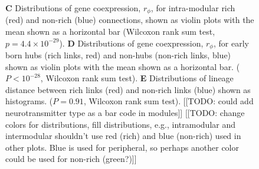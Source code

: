 \documentclass[10pt,letterpaper]{article}
\begin{document}
\begin{figure}[!h]
{%
\textbf{C} Distributions of gene coexpression, $r_\phi$, for intra-modular rich (red) and non-rich (blue) connections, shown as violin plots with the mean shown as a horizontal bar (Wilcoxon rank sum test, $p = 4.4\times 10^{-29}$).
\textbf{D} Distributions of gene coexpression, $r_\phi$, for early born hubs (rich links, red) and non-hubs (non-rich links, blue) shown as violin plots with the mean shown as a horizontal bar. ($P < 10^{-28}$, Wilcoxon rank sum test).
\textbf{E} Distributions of lineage distance between rich links (red) and non-rich links (blue) shown as histograms. ($P = 0.91$, Wilcoxon rank sum test).
[[TODO: could add neurotransmitter type as a bar code in modules]]
[[TODO: change colors for distributions, fill distributions, e.g., intramodular and intermodular shouldn't use red (rich) and blue (non-rich) used in other plots. Blue is used for peripheral, so perhaps another color could be used for non-rich (green?)]]
}
 \label{fig:OtherInfluences}
\end{figure}
\end{document}
